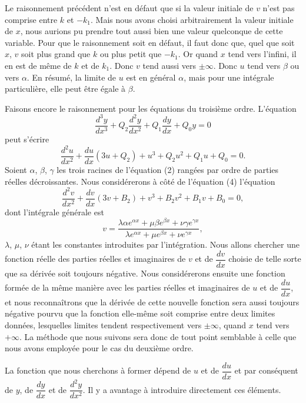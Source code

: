 \documentclass[11pt]{article}
\begin{document}
Le raisonnement précédent n'est en défaut que si la valeur initiale de $v$ n'est pas comprise entre $k$ et $-k_1$. Mais nous avons choisi arbitrairement la valeur initiale de $x$, nous aurions pu prendre tout aussi bien une valeur quelconque de cette variable. Pour que le raisonnement soit en défaut, il faut donc que, quel que soit $x$, $v$ soit plus grand que $k$ ou plus petit que $-k_1$. Or quand $x$ tend vers l'infini, il en est de même de $k$ et de $k_1$. Donc $v$ tend aussi vers $\pm\infty$. Donc $u$ tend vers $\beta$ ou vers $\alpha$. En résumé, la limite de $u$ est en général $\alpha$, mais pour une intégrale particulière, elle peut être égale à $\beta$.

Faisons encore le raisonnement pour les équations du troisième ordre. L'équation
\[
\frac{d^3y}{dx^3}+Q_2\frac{d^2y}{dx^2}+Q_1\frac{dy}{dx}+Q_0y=0
\]
peut s'écrire
\[
\tag{4}
\frac{d^2u}{dx^2}+\frac{du}{dx}(3u+Q_2)+u^3+Q_2u^2+Q_1u+Q_0=0.
\]
Soient $\alpha$, $\beta$, $\gamma$ les trois racines de l'équation (2) rangées par ordre de parties réelles décroissantes. Nous considérerons à côté de l'équation (4) l'équation
\[
\tag{4\,bis}
\frac{d^2v}{dx^2}+\frac{dv}{dx}(3v+B_2)+v^3+B_2v^2+B_1v+B_0=0,
\]
dont l'intégrale générale est
\[
v=\frac{\lambda\alpha e^{\alpha x}+\mu\beta e^{\beta x}+\nu\gamma e^{\gamma x}}{\lambda e^{\alpha x}+\mu e^{\beta x}+\nu e^{\gamma x}},
\]
$\lambda$, $\mu$, $\nu$ étant les constantes introduites par l'intégration. Nous allons chercher une fonction réelle des parties réelles et imaginaires de $v$ et de $\dfrac{dv}{dx}$ choisie de telle sorte que sa dérivée soit toujours négative. Nous considérerons ensuite une fonction formée de la même manière avec les parties réelles et imaginaires de $u$ et de $\dfrac{du}{dx}$, et nous reconnaîtrons que la dérivée de cette nouvelle fonction sera aussi toujours négative pourvu que la fonction elle-même soit comprise entre deux limites données, lesquelles limites tendent respectivement vers $\pm\infty$, quand $x$ tend vers $+\infty$. La méthode que nous suivons sera donc de tout point semblable à celle que nous avons employée pour le cas du deuxième ordre.

La fonction que nous cherchons à former dépend de $u$ et de $\dfrac{du}{dx}$ et par conséquent de $y$, de $\dfrac{dy}{dx}$ et de $\dfrac{d^2y}{dx^2}$. Il y a avantage à introduire directement ces éléments.
\end{document}
